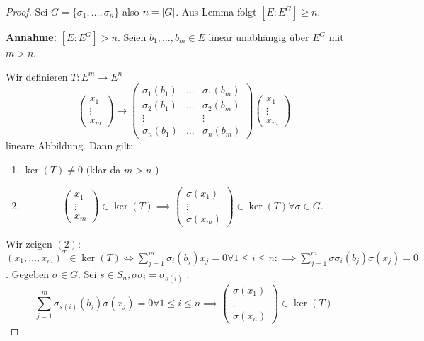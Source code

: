 \begin{proof}
	Sei $G = \{\sigma_1,\ldots,\sigma_{n}\}$ also $n = \abs{G}$. Aus Lemma folgt $[E : E^{G}] \geq n$.

	\textbf{Annahme:} $[E: E^{G}] > n$. Seien $b_1,\ldots, b_{m} \in E$ linear unabhängig über $E^{G}$ mit $m > n$.

	Wir definieren $T: E^{m} \to  E^{n}$
	\[
	\begin{pmatrix} 
		x_1 \\ \vdots \\ x_{m}
	\end{pmatrix} \mapsto \begin{pmatrix} 
	\sigma_1(b_1) &\ldots &\sigma_{1}(b_{m})\\
	\sigma_2(b_1) &\ldots &\sigma_{2}(b_{m})\\
	\vdots & &\vdots\\
	\sigma_n(b_1) &\ldots &\sigma_{n}(b_{m})
	\end{pmatrix} \begin{pmatrix} 
		x_1 \\ \vdots\\ x_{m}
	\end{pmatrix} 
	\] 
	lineare Abbildung. Dann gilt:
	\begin{enumerate}
		\item $\ker(T) \neq 0$ (klar da $m > n$ )
		\item  \[
		\begin{pmatrix} 
			x_1\\ \vdots\\ x_{m}
		\end{pmatrix} \in \ker(T) \implies \begin{pmatrix} 
		\sigma(x_1)\\ \vdots\\ \sigma(x_{m})
	\end{pmatrix} \in \ker(T) \forall \sigma \in G
		.\] 
	\end{enumerate}
	Wir zeigen $(2)$:  $(x_1,\ldots,x_{m})^{T} \in \ker(T) \Leftrightarrow \sum_{j=1}^{m} \sigma_{i}(b_{j})x_{j} = 0 \forall 1 \leq i \leq n :\implies \sum_{j=1}^{m} \sigma \sigma_{i}
	(b_{j}) \sigma(x_{j}) = 0$. Gegeben $\sigma \in G$. Sei $s \in S_{n}, \sigma \sigma_{i} = \sigma_{s(i)}$ :
	\[
		\sum_{j=1}^{m} \sigma_{s(i)}(b_{j}) \sigma(x_{j}) = 0 \forall 1 \leq i \leq n \implies \begin{pmatrix} 
			\sigma(x_1)\\ \vdots\\ \sigma(x_{n})
		\end{pmatrix} \in \ker(T)
\]
\end{proof}
